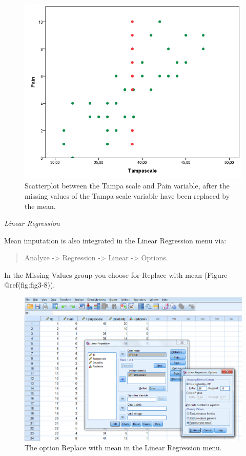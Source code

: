 \documentclass[
]{book}
\begin{document}
\begin{figure}

{\centering \includegraphics[width=0.7\linewidth]{images/fig3.4} 

}

\caption{Scatterplot between the Tampa scale and Pain variable, after the missing values of the Tampa scale variable have been replaced by the mean.}\label{fig:fig3-4}
\end{figure}

\emph{Linear Regression}

Mean imputation is also integrated in the Linear Regression menu via:

\begin{quote}
Analyze -\textgreater{} Regression -\textgreater{} Linear
-\textgreater{} Options.
\end{quote}

In the Missing Values group you choose for Replace with mean (Figure
@ref(fig:fig3-8)).

\begin{figure}

{\centering \includegraphics[width=0.7\linewidth]{images/fig3.8} 

}

\caption{The option Replace with mean in the Linear Regression menu.}\label{fig:fig3-8}
\end{figure}
\end{document}
